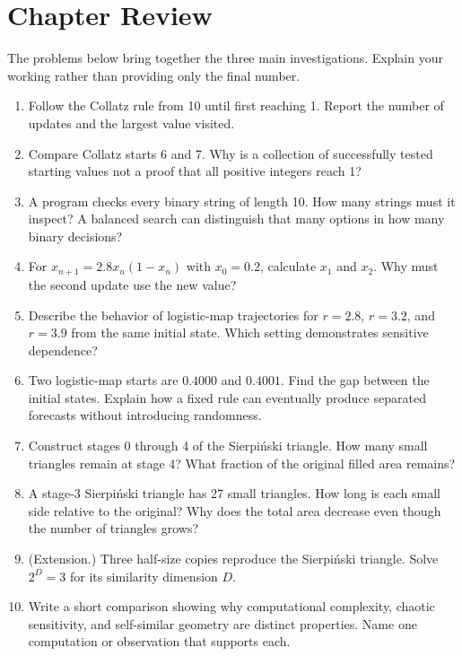 \documentclass[11pt,letterpaper]{article}
\begin{document}
\section*{Chapter Review}
The problems below bring together the three main investigations. Explain your working rather than providing only the final number.
\begin{enumerate}
\item Follow the Collatz rule from 10 until first reaching 1. Report the number of updates and the largest value visited.
\item Compare Collatz starts 6 and 7. Why is a collection of successfully tested starting values not a proof that all positive integers reach 1?
\item A program checks every binary string of length 10. How many strings must it inspect? A balanced search can distinguish that many options in how many binary decisions?
\item For $x_{n+1}=2.8x_n(1-x_n)$ with $x_0=0.2$, calculate $x_1$ and $x_2$. Why must the second update use the new value?
\item Describe the behavior of logistic-map trajectories for $r=2.8$, $r=3.2$, and $r=3.9$ from the same initial state. Which setting demonstrates sensitive dependence?
\item Two logistic-map starts are $0.4000$ and $0.4001$. Find the gap between the initial states. Explain how a fixed rule can eventually produce separated forecasts without introducing randomness.
\item Construct stages 0 through 4 of the Sierpi\'nski triangle. How many small triangles remain at stage 4? What fraction of the original filled area remains?
\item A stage-3 Sierpi\'nski triangle has 27 small triangles. How long is each small side relative to the original? Why does the total area decrease even though the number of triangles grows?
\item (Extension.) Three half-size copies reproduce the Sierpi\'nski triangle. Solve $2^D=3$ for its similarity dimension $D$.
\item Write a short comparison showing why computational complexity, chaotic sensitivity, and self-similar geometry are distinct properties. Name one computation or observation that supports each.
\end{enumerate}
\end{document}

